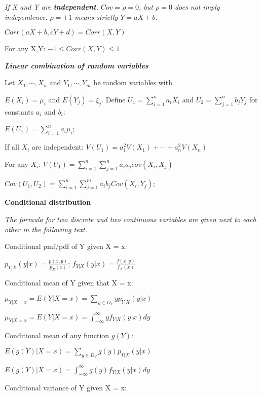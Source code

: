 \documentclass{article}
\newcommand{\bigtitle}[1]{
	\noindent
	\textbf{#1}
}
\newcommand{\smalltitle}[1]{
	\noindent
	\textbf{\textit{#1}}
}
\begin{document}
	\textit{If X and Y are \textbf{independent}, $Cov = \rho = 0$, but $\rho = 0$ does not imply independence. $\rho = \pm 1$ means strictly $Y = aX+b$.}%
	
	
	$Corr(aX+b,cY+d) = Corr(X,Y)$
	
	For any X,Y: $-1\leq Corr(X,Y) \leq 1$
	
	
	
	
	
	\smalltitle{Linear combination of random variables}
	
	Let $X_1, \cdots, X_n$ and $Y_1,\cdots, Y_m$ be random variables with 
	
	\noindent
	$E(X_i) = \mu_i$ and $E(Y_j) = \xi_j$. Define $U_1 = \sum \limits_{i=1}^{n}a_iX_i$ and $U_2 = \sum \limits_{j=1}^n b_jY_j$ for constants $a_i$ and $b_i$:
	
	$E(U_1) = \sum \limits_{i=1}^{n}a_i\mu_i$;
	
	If all $X_i$ are independent:
	$V(U_1) = a_1^2V(X_1) + \cdots + a_n^2V(X_n)$
	
	
	For any $X_i$:
	$V(U_1) = \sum \limits_{i=1}^n \sum \limits_{j=1}^n a_ia_jcov(X_i,X_j)$
	
	$Cov(U_1,U_2)=\sum \limits_{i=1}^{n}\sum \limits_{j=1}^{m}a_ib_jCov(X_i,Y_j)$;
	
	
	
	
	
	\bigtitle{Conditional distribution}
	
	
	\textit{The formula for two discrete and two continuous variables are given next to each other in the following text.}
	
	
	Conditional pmf/pdf of Y given X = x:
	
	$p_{Y|X}(y|x) = \frac{p(x,y)}{p_X(x)}$; 
	$f_{Y|X}(y|x) = \frac{f(x,y)}{f_X(x)}$
	
	
	Conditional mean of Y given that X = x:
	
	$\mu_{Y|X=x} = E(Y|X=x)=\sum \limits_{y\in D_Y}yp_{Y|X}(y|x)$
	
	
	$\mu_{Y|X=x} = E(Y|X=x)=\int_{-\infty}^{\infty}yf_{Y|X}(y|x)dy$
	
	Conditional mean of any function $g(Y)$:
	
	
	$E(g(Y)|X=x)=\sum \limits_{y\in D_Y}g(y)p_{Y|X}(y|x)$
	
	
	$E(g(Y)|X=x)=\int_{-\infty}^{\infty}g(y)f_{Y|X}(y|x)dy$
	
	
	Conditional variance of Y given X = x:
	
\end{document}

